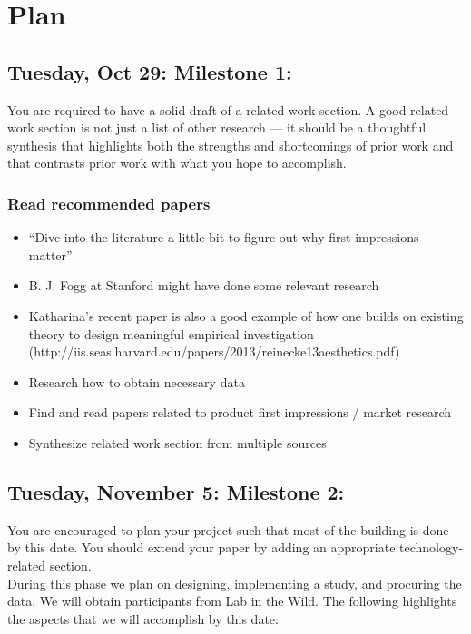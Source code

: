 \documentclass{article}
\begin{document}
\section{Plan}

\subsection{Tuesday, Oct 29: Milestone 1:}

You are required to have a solid draft of a related work section. A good related work section is not just a list of other research --- it should be a thoughtful synthesis that highlights both the strengths and shortcomings of prior work and that contrasts prior work with what you hope to accomplish. \\

\subsubsection{Read recommended papers}
\begin{itemize}
\item “Dive into the literature a little bit to figure out why first impressions matter”
\item B. J. Fogg at Stanford might have done some relevant research
\item Katharina's recent paper is also a good example of how one builds on existing theory to design meaningful empirical investigation (http://iis.seas.harvard.edu/papers/2013/reinecke13aesthetics.pdf)
\item Research how to obtain necessary data
\item Find and read papers related to product first impressions / market research
\item Synthesize related work section from multiple sources
\end{itemize}

\subsection{Tuesday, November 5: Milestone 2:}

You are encouraged to plan your project such that most of the building is done by this date. You should extend your paper by adding an appropriate
technology-related section.\\

During this phase we plan on designing,  implementing a study, and procuring the data. We will obtain participants from Lab in the Wild. The following highlights the aspects that we will accomplish by this date:
\end{document}
